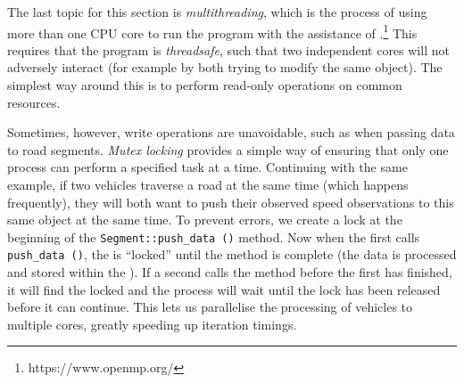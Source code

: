The last topic for this section is \emph{multithreading}, which is the process of using more than one CPU core to run the program with the assistance of .\footnote{https://www.openmp.org/} This requires that the program is \emph{threadsafe}, such that two independent cores will not adversely interact (for example by both trying to modify the same object). The simplest way around this is to perform read-only operations on common resources.

Sometimes, however, write operations are unavoidable, such as when passing data to road segments. \emph{Mutex locking} provides a simple way of ensuring that only one process can perform a specified task at a time. Continuing with the same example, if two vehicles traverse a road at the same time (which happens frequently), they will both want to push their observed speed observations to this same  object at the same time. To prevent errors, we create a lock at the beginning of the \verb+Segment::push_data ()+ method. Now when the first  calls \verb+push_data ()+, the  is ``locked'' until the method is complete (the data is processed and stored within the ). If a second  calls the method before the first has finished, it will find the  locked and the process will wait until the lock has been released before it can continue. This lets us parallelise the processing of vehicles to multiple cores, greatly speeding up iteration timings.

